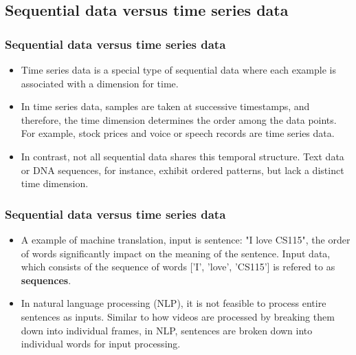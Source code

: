 \documentclass[11pt,]{beamer}
\begin{document}
\subsection{Sequential data versus time series data}
\begin{frame}
        \frametitle{Sequential data versus time series data}
        \begin{itemize}
            \item Time series data is a special type of sequential data where each example is associated with a dimension for time.
            \item In time series data, samples are taken at successive timestamps, and therefore, the
            time dimension determines the order among the data points. For example, stock prices and voice or speech records are time series data.
            \item In contrast, not all sequential data shares this temporal structure. Text data or DNA sequences, for instance, exhibit ordered patterns, but lack a distinct time dimension.
        \end{itemize}
\end{frame}
\begin{frame}
        \frametitle{Sequential data versus time series data}
        \begin{itemize}
            \item A example of machine translation, input is sentence: "I love CS115", the order of words significantly impact on the meaning of the sentence. Input data, which consists of the sequence of words ['I', 'love', 'CS115'] is refered to as \textbf{sequences}.
            \item In natural language processing (NLP), it is not feasible to process entire sentences as inputs. Similar to how videos are processed by breaking them down into individual frames, in NLP, sentences are broken down into individual words for input processing.
        \end{itemize}
\end{frame}
\end{document}
